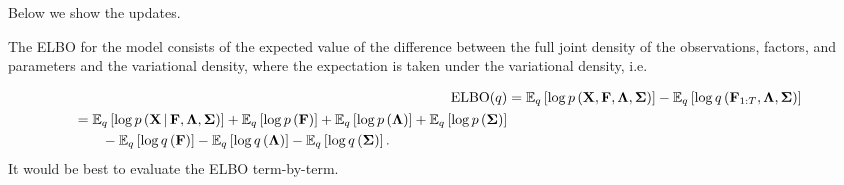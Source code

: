 Below we show the updates.

The ELBO for the model consists of the expected value of the difference between the full joint density of the observations, factors, and parameters and the variational density, where the expectation is taken under the variational density, i.e.

\begin{align}
	\text{ELBO}(q) 
		&= \mathbb{E}_q \left[ \log p \left( \bf X, F, {\bm \Lambda}, {\bm \Sigma} \right) \right] - \mathbb{E}_q  \left[ \log q \left( {\bf F}_{1:T}, {\bf {\bm \Lambda}, {\bm \Sigma}} \right) \right] \\
	\begin{split}
		&= \mathbb{E}_q \left[ \log p \left( \bf X \,|\, F, {\bm \Lambda}, {\bm \Sigma} \right) \right] + \mathbb{E}_q \left[ \log p \left( \bf F \right) \right] + \mathbb{E}_q \left[ \log p \left( \bm \Lambda \right) \right] + \mathbb{E}_q \left[ \log p \left( \bm \Sigma \right) \right] \\
		&\qquad - \mathbb{E}_q \left[ \log q \left( {\bf F} \right) \right]- \mathbb{E}_q \left[ \log q \left( {\bm \Lambda} \right) \right]- \mathbb{E}_q \left[ \log q \left( {\bm \Sigma} \right) \right].
	\end{split}
\end{align}
It would be best to evaluate the ELBO term-by-term.
